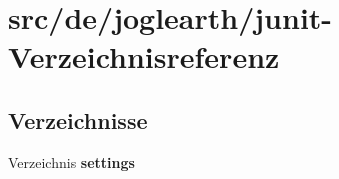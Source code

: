 \section{src/de/joglearth/junit-\/\-Verzeichnisreferenz}
\label{dir_7c6849b11c70986d77856fe133afe8c3}
\subsection*{Verzeichnisse}
\begin{DoxyCompactItemize}
\item 
Verzeichnis {\bf settings}
\end{DoxyCompactItemize}
